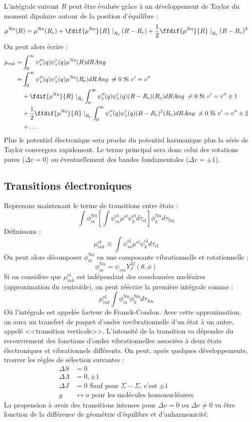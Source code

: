 L'intégrale suivant $R$ peut être évaluée grâce à un développement de Taylor du moment dipolaire autour de la position d'équilibre :
\[
\mu^\text{Nu}(R) = \mu^\text{Nu}(R_e) + \fdif{\mu^\text{Nu}}{R}\left.\right|_{R_e}(R-R_e) + \dfrac{1}{2}\ffdif{\mu^\text{Nu}}{R}\left.\right|_{R_e}(R-R_e)^2
\]
On peut alors écrire :
\begin{align*}
    \mu_{mk} =& \int^{\infty}_0\psi_v''(q)\psi_v'(q)\mu^\text{Nu}(R)dRAng\\
        =& \int^{\infty}_0\psi_v''(q)\psi_v'(q)\mu^\text{Nu}(R_e)dRAng \; \neq 0 \textrm{ Si $v' = v''$}\\
        &+ \fdif{\mu^\text{Nu}}{R}\left.\right|_{R_e}\int^{\infty}_0\psi_v''(q)\psi_v'(q)(R-R_e)(R_e)dRAng \; \neq 0 \textrm{ Si $v' = v''\pm1$}\\
        &+ \dfrac{1}{2}\ffdif{\mu^\text{Nu}}{R}\left.\right|_{R_e}\int^{\infty}_0\psi_v''(q)\psi_v'(q)(R-R_e)^2(R_e)dRAng \; \neq 0 \textrm{ Si $v' = v''\pm2$}\\
        &+ \hdots
\end{align*}
Plus le potentiel électronique sera proche du potentiel harmonique plus la série de Taylor convergera rapidement. Le terme principal sera donc celui des rotations pures ($\Delta v = 0$) ou éventuellement des bandes fondamentales ($\Delta v = \pm1$).


\subsection{Transitions électroniques}


Reprenons maintenant le terme de transitions entre états :
\[
\int \phi^\text{Nu}_m\left[\int \psi^\text{el}_m\mu^\text{el}\psi^\text{el}_kd\tau_\text{el} \right]\phi^\text{Nu}_kd\tau_\text{Nu}
\]
Définissons :
\[
\mu^\text{el}_{mk} \equiv \int \psi^\text{el}_m\mu^\text{el}\psi^\text{el}_kd\tau_\text{el}
\]
On peut alors décomposer $\phi_m^\text{Nu}$ en une composante vibrationnelle et rotationnelle :
\[
\phi_m^\text{Nu} = \psi_{vm}Y_J^M(\theta,\phi)
\]
Si on considère que $\mu^\text{el}_{mk}$ est indépendant des coordonnées nucléaires (approximation du centroïde), on peut réécrire la première intégrale comme :
\[
\mu^\text{el}_{mk} \int \phi^\text{Nu}_m\phi^\text{Nu}_kd\tau_\text{Nu}
\]
Où l'intégrale est appelée facteur de Franck-Condon. Avec cette approximation, on aura un transfert de paquet d'ondes rovibrationnelle d'un état à un autre, appelé <<transition verticale>>. L'intensité de la transition va dépendre du recouvrement des fonctions d'ondes vibrationnelles associées à deux états électroniques et vibrationnels différents. On peut, après quelques développements, trouver les règles de sélection suivantes :
\begin{align*}
    \Delta S &= 0\\
    \Delta\Lambda &= 0,\pm1\\
    \Delta J &= 0 \textrm{ Sauf pour $\Sigma-\Sigma$, c'est $\pm1$}\\
    g &\leftrightarrow u \textrm{ pour les molécules homonucléaires}
\end{align*}
La propension à avoir des transitions intenses pour $\Delta v = 0$ ou $\Delta v \neq 0$ va être fonction de la différence de géométrie d'équilibre et d'anharmonicité.


